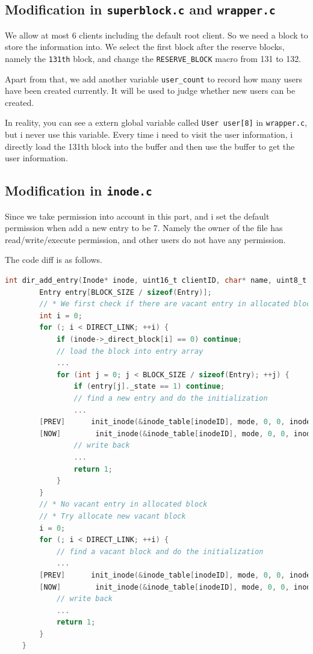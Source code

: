 \subsection{Modification in \texttt{superblock.c} and \texttt{wrapper.c}}
We allow at most 6 clients including the default root client. So we need a block to store the information into. 
We select the first block after the reserve blocks, namely the \texttt{131th} block, and change the \texttt{RESERVE_BLOCK} macro from 131 to 132.

Apart from that, we add another variable \texttt{user\_count} to record how many users have been created currently.
It will be used to judge whether new users can be created.

In reality, you can see a extern global variable called \texttt{User user[8]} in \texttt{wrapper.c}, but i 
never use this variable. Every time i need to visit the user information, i directly load the 131th block into the buffer and then
use the buffer to get the user information. 

\subsection{Modification in \texttt{inode.c}}
Since we take permission into account in this part, and i set the default permission when add a new entry to be 7. Namely the owner of the 
file has read/write/execute permission, and other users do not have any permission.

The code diff is as follows.

\begin{lstlisting}[language=C]
    int dir_add_entry(Inode* inode, uint16_t clientID, char* name, uint8_t mode) {
        Entry entry[BLOCK_SIZE / sizeof(Entry)];
        // * We first check if there are vacant entry in allocated block
        int i = 0;
        for (; i < DIRECT_LINK; ++i) {
            if (inode->_direct_block[i] == 0) continue;
            // load the block into entry array
            ...
            for (int j = 0; j < BLOCK_SIZE / sizeof(Entry); ++j) {
                if (entry[j]._state == 1) continue;
                // find a new entry and do the initialization
                ...
        [PREV]      init_inode(&inode_table[inodeID], mode, 0, 0, inodeID, inode->_index, 0, clientID);
        [NOW]        init_inode(&inode_table[inodeID], mode, 0, 0, inodeID, inode->_index, 7, clientID);
                // write back
                ... 
                return 1;
            }
        }
        // * No vacant entry in allocated block
        // * Try allocate new vacant block
        i = 0;
        for (; i < DIRECT_LINK; ++i) {
            // find a vacant block and do the initialization
            ...
        [PREV]      init_inode(&inode_table[inodeID], mode, 0, 0, inodeID, inode->_index, 0, clientID);
        [NOW]        init_inode(&inode_table[inodeID], mode, 0, 0, inodeID, inode->_index, 7, clientID);
            // write back
            ...
            return 1;
        }
    }    
\end{lstlisting}

